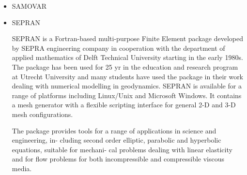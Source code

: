 \begin{itemize}
\item SAMOVAR

{\small
\noindent
\cite{egat10}
}

\item {\codefont SEPRAN} 

SEPRAN \cite{sepr05} is a Fortran-based
multi-purpose Finite Element package developed by SEPRA engineering company in
cooperation with the department of applied mathematics of Delft Technical University
starting in the early 1980s. The package has been used for 25 yr in the education and
research program at Utrecht University and many students have used the package in
their work dealing with numerical modelling in geodynamics. SEPRAN is available for
a range of platforms including Linux/Unix and Microsoft Windows. It contains a mesh
generator with a flexible scripting interface for general 2-D and 3-D mesh configurations.

The package provides tools for a range of applications in science and engineering, in-
cluding second order elliptic, parabolic and hyperbolic equations, suitable for mechani-
cal problems dealing with linear elasticity and for flow problems for both incompressible
and compressible viscous media.


\end{itemize}
